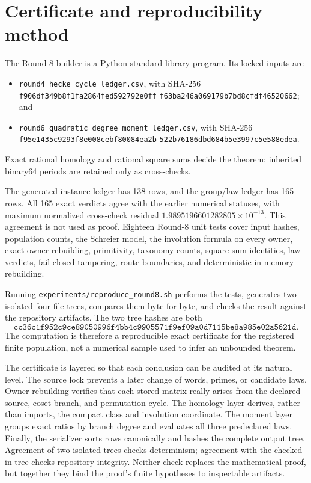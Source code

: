 \documentclass[11pt]{article}
\theoremstyle{definition}
\theoremstyle{remark}
\begin{document}
\section{Certificate and reproducibility method}\label{sec:repro}

The Round-8 builder is a Python-standard-library program. Its locked inputs are
\begin{itemize}
\item \texttt{round4\_hecke\_cycle\_ledger.csv}, with
\newline SHA-256
\texttt{f906df349b8f1fa2864fed592792e0ff}\newline
\texttt{f63ba246a069179b7bd8cfdf46520662}; and
\item \texttt{round6\_quadratic\_degree\_moment\_ledger.csv}, with
\newline SHA-256
\texttt{f95e1435c9293f8e008cebf80084ea2b}\newline
\texttt{522b76186dbd684b5e3997c5e588edea}.
\end{itemize}
Exact rational homology and rational square sums decide the theorem; inherited binary64 periods are retained only as cross-checks.

The generated instance ledger has 138 rows, and the group/law ledger has 165 rows. All 165 exact verdicts agree with the earlier numerical statuses, with maximum normalized cross-check residual $1.9895196601282805\times10^{-13}$. This agreement is not used as proof. Eighteen Round-8 unit tests cover input hashes, population counts, the Schreier model, the involution formula on every owner, exact owner rebuilding, primitivity, taxonomy counts, square-sum identities, law verdicts, fail-closed tampering, route boundaries, and deterministic in-memory rebuilding.

Running \texttt{experiments/reproduce\_round8.sh} performs the tests, generates two isolated four-file trees, compares them byte for byte, and checks the result against the repository artifacts. The two tree hashes are both
\[
\texttt{cc36c1f952c9ce89050996f4bb4c9905571f9ef09a0d7115be8a985e02a5621d}.
\]
The computation is therefore a reproducible exact certificate for the registered finite population, not a numerical sample used to infer an unbounded theorem.

The certificate is layered so that each conclusion can be audited at its natural level. The source lock prevents a later change of words, primes, or candidate laws. Owner rebuilding verifies that each stored matrix really arises from the declared source, coset branch, and permutation cycle. The homology layer derives, rather than imports, the compact class and involution coordinate. The moment layer groups exact ratios by branch degree and evaluates all three predeclared laws. Finally, the serializer sorts rows canonically and hashes the complete output tree. Agreement of two isolated trees checks determinism; agreement with the checked-in tree checks repository integrity. Neither check replaces the mathematical proof, but together they bind the proof's finite hypotheses to inspectable artifacts.
\end{document}
